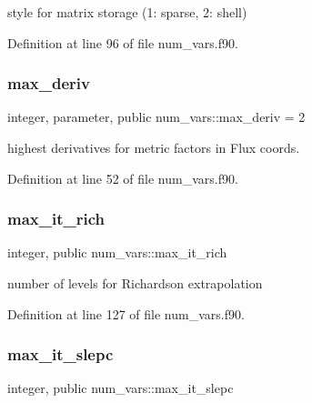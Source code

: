 style for matrix storage (1\+: sparse, 2\+: shell) 



Definition at line 96 of file num\+\_\+vars.\+f90.

\mbox{\label{namespacenum__vars_a78f5aeea9d9c2f41e388bfcef9021e64}} 
\subsubsection{\texorpdfstring{max\+\_\+deriv}{max\_deriv}}
{\footnotesize\ttfamily integer, parameter, public num\+\_\+vars\+::max\+\_\+deriv = 2}



highest derivatives for metric factors in Flux coords. 



Definition at line 52 of file num\+\_\+vars.\+f90.

\mbox{\label{namespacenum__vars_afbd4cb9a4ef9e8a277aecfc41b09aa1d}} 
\subsubsection{\texorpdfstring{max\+\_\+it\+\_\+rich}{max\_it\_rich}}
{\footnotesize\ttfamily integer, public num\+\_\+vars\+::max\+\_\+it\+\_\+rich}



number of levels for Richardson extrapolation 



Definition at line 127 of file num\+\_\+vars.\+f90.

\mbox{\label{namespacenum__vars_a8855ce3cc66743410c56c1dfecbc6a1a}} 
\subsubsection{\texorpdfstring{max\+\_\+it\+\_\+slepc}{max\_it\_slepc}}
{\footnotesize\ttfamily integer, public num\+\_\+vars\+::max\+\_\+it\+\_\+slepc}



